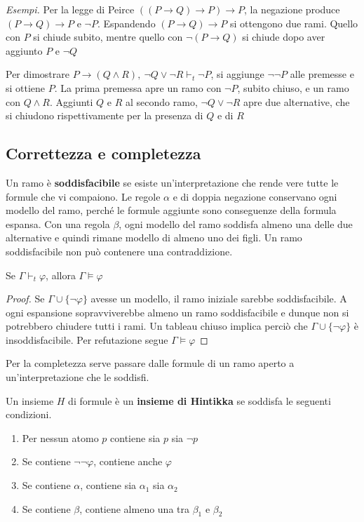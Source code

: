 \medskip
\noindent
\textit{Esempi.} Per la legge di Peirce
$((P\to Q)\to P)\to P$, la negazione produce $(P\to Q)\to P$
e $\neg P$. Espandendo $(P\to Q)\to P$ si ottengono due rami.
Quello con $P$ si chiude subito, mentre quello con $\neg(P\to Q)$
si chiude dopo aver aggiunto $P$ e $\neg Q$

\medskip
\noindent
Per dimostrare $P\to(Q\wedge R),\ \neg Q\vee\neg R\vdash_t\neg P$,
si aggiunge $\neg\neg P$ alle premesse e si ottiene $P$. La
prima premessa apre un ramo con $\neg P$, subito chiuso, e un
ramo con $Q\wedge R$. Aggiunti $Q$ e $R$ al secondo ramo,
$\neg Q\vee\neg R$ apre due alternative, che si chiudono
rispettivamente per la presenza di $Q$ e di $R$

\subsection{Correttezza e completezza}
Un ramo è \textbf{soddisfacibile} se esiste un'interpretazione
che rende vere tutte le formule che vi compaiono. Le regole
$\alpha$ e di doppia negazione conservano ogni modello del ramo,
perché le formule aggiunte sono conseguenze della formula espansa.
Con una regola $\beta$, ogni modello del ramo soddisfa almeno
una delle due alternative e quindi rimane modello di almeno uno
dei figli. Un ramo soddisfacibile non può contenere una
contraddizione.

\medskip
\noindent
\colorbox{SALZO}{\parbox{\dimexpr\linewidth-2\fboxsep}{
\begin{theorem}
    Se $\Gamma\vdash_t\varphi$, allora $\Gamma\models\varphi$
\end{theorem}
}}%

\begin{proof}
    Se $\Gamma\cup\{\neg\varphi\}$ avesse un modello, il ramo
    iniziale sarebbe soddisfacibile. A ogni espansione
    sopravviverebbe almeno un ramo soddisfacibile e dunque non
    si potrebbero chiudere tutti i rami. Un tableau chiuso
    implica perciò che $\Gamma\cup\{\neg\varphi\}$ è
    insoddisfacibile. Per refutazione segue $\Gamma\models\varphi$
\end{proof}

\noindent
Per la completezza serve passare dalle formule di un ramo aperto
a un'interpretazione che le soddisfi.

\medskip
\noindent
\colorbox{SALZO}{\parbox{\dimexpr\linewidth-2\fboxsep}{
\begin{definition}
    Un insieme $H$ di formule è un \textbf{insieme di Hintikka}
    se soddisfa le seguenti condizioni.
    \begin{enumerate}
        \item Per nessun atomo $p$ contiene sia $p$ sia $\neg p$
        \item Se contiene $\neg\neg\varphi$, contiene anche $\varphi$
        \item Se contiene $\alpha$, contiene sia $\alpha_1$ sia $\alpha_2$
        \item Se contiene $\beta$, contiene almeno una tra $\beta_1$ e $\beta_2$
    \end{enumerate}
\end{definition}
}}%

